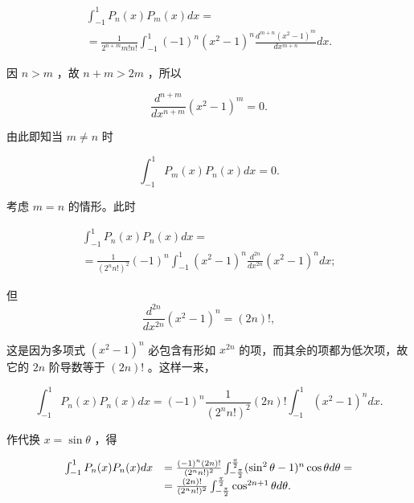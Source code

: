 \begin{equation*}
\begin{array}{l} \int_ {- 1} ^ {1} P _ {n} (x) P _ {m} (x) d x = \\ = \frac {1}{2 ^ {n + m} m ! n !} \int_ {- 1} ^ {1} (- 1) ^ {n} (x ^ {2} - 1) ^ {n} \frac {d ^ {m + n} (x ^ {2} - 1) ^ {m}}{d x ^ {m + n}} d x. \end{array}
\end{equation*}

因 $n > m$ ，故 $n + m > 2m$ ，所以

\begin{equation*}
\frac {d ^ {n + m}}{d x ^ {n + m}} (x ^ {2} - 1) ^ {m} = 0.
\end{equation*}

由此即知当 $m \neq n$ 时

\begin{equation*}
\int_ {- 1} ^ {1} P _ {m} (x) P _ {n} (x) d x = 0.
\end{equation*}

考虑 $m = n$ 的情形。此时

\begin{equation*}
\begin{array}{l} \int_ {- 1} ^ {1} P _ {n} (x) P _ {n} (x) d x = \\ = \frac {1}{(2 ^ {n} n !) ^ {2}} (- 1) ^ {n} \int_ {- 1} ^ {1} (x ^ {2} - 1) ^ {n} \frac {d ^ {2 n}}{d x ^ {2 n}} (x ^ {2} - 1) ^ {n} d x; \end{array}
\end{equation*}

但
\begin{equation*}
\frac {d ^ {2 n}}{d x ^ {2 n}} (x ^ {2} - 1) ^ {n} = (2 n)! ,
\end{equation*}

这是因为多项式 $(x^{2} - 1)^{n}$ 必包含有形如 $x^{2n}$ 的项，而其余的项都为低次项，故它的 $2n$ 阶导数等于 $(2n)!$ 。这样一来，

\begin{equation*}
\int_ {- 1} ^ {1} P _ {n} (x) P _ {n} (x) d x = (- 1) ^ {n} \frac {1}{(2 ^ {n} n !) ^ {2}} (2 n)! \int_ {- 1} ^ {1} (x ^ {2} - 1) ^ {n} d x.
\end{equation*}

作代换 $x = \sin \theta$ ，得

\begin{equation*}
\begin{array}{r l} \int_ {- 1} ^ {1} P _ {n} (x) P _ {n} (x) d x & = \frac {(- 1) ^ {n} (2 n) !}{(2 ^ {n} n !) ^ {2}} \int_ {- \frac {\pi}{2}} ^ {\frac {\pi}{2}} (\sin^ {2} \theta - 1) ^ {n} \cos \theta d \theta = \\ & = \frac {(2 n) !}{(2 ^ {n} n !) ^ {2}} \int_ {- \frac {\pi}{2}} ^ {\frac {\pi}{2}} \cos^ {2 n + 1} \theta d \theta . \end{array}
\end{equation*}

